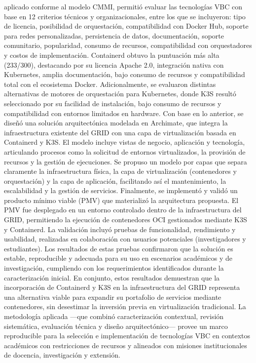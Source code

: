 aplicado conforme al modelo CMMI, permitió evaluar las tecnologías VBC con base en 12 criterios técnicos y organizacionales, entre los que se incluyeron: tipo de licencia, posibilidad de orquestación, compatibilidad con Docker Hub, soporte para redes personalizadas, persistencia de datos, documentación, soporte comunitario, popularidad, consumo de recursos, compatibilidad con orquestadores y costos de implementación. Containerd obtuvo la puntuación más alta (233/300), destacando por su licencia Apache 2.0, integración nativa con Kubernetes, amplia documentación, bajo consumo de recursos y compatibilidad total con el ecosistema Docker. Adicionalmente, se evaluaron distintas alternativas de motores de orquestación para Kubernetes, donde K3S resultó seleccionado por su facilidad de instalación, bajo consumo de recursos y compatibilidad con entornos limitados en hardware. Con base en lo anterior, se diseñó una solución arquitectónica modelada en Archimate, que integra la infraestructura existente del GRID con una capa de virtualización basada en Containerd y K3S. El modelo incluye vistas de negocio, aplicación y tecnología, articulando procesos como la solicitud de entornos virtualizados, la provisión de recursos y la gestión de ejecuciones. Se propuso un modelo por capas que separa claramente la infraestructura física, la capa de virtualización (contenedores y orquestación) y la capa de aplicación, facilitando así el mantenimiento, la escalabilidad y la gestión de servicios. Finalmente, se implementó y validó un producto mínimo viable (PMV) que materializó la arquitectura propuesta. El PMV fue desplegado en un entorno controlado dentro de la infraestructura del GRID, permitiendo la ejecución de contenedores OCI gestionados mediante K3S y Containerd. La validación incluyó pruebas de funcionalidad, rendimiento y usabilidad, realizadas en colaboración con usuarios potenciales (investigadores y estudiantes). Los resultados de estas pruebas confirmaron que la solución es estable, reproducible y adecuada para su uso en escenarios académicos y de investigación, cumpliendo con los requerimientos identificados durante la caracterización inicial. En conjunto, estos resultados demuestran que la incorporación de Containerd y K3S en la infraestructura del GRID representa una alternativa viable para expandir su portafolio de servicios mediante contenedores, sin desestimar la inversión previa en virtualización tradicional. La metodología aplicada —que combinó caracterización contextual, revisión sistemática, evaluación técnica y diseño arquitectónico— provee un marco reproducible para la selección e implementación de tecnologías VBC en contextos académicos con restricciones de recursos y alineados con misiones institucionales de docencia, investigación y extensión.